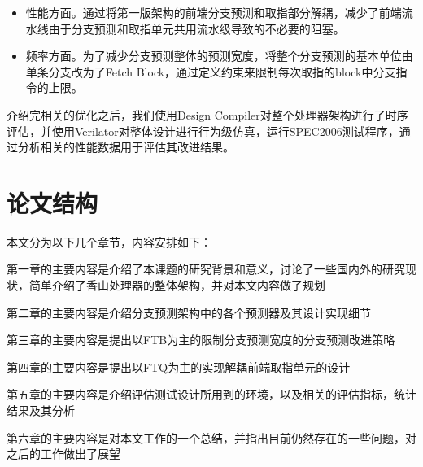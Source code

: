 \begin{itemize}
	\item 性能方面。通过将第一版架构的前端分支预测和取指部分解耦，减少了前端流水线由于分支预测和取指单元共用流水级导致的不必要的阻塞。
	\item 频率方面。为了减少分支预测整体的预测宽度，将整个分支预测的基本单位由单条分支改为了Fetch Block，通过定义约束来限制每次取指的block中分支指令的上限。
\end{itemize}

介绍完相关的优化之后，我们使用Design Compiler对整个处理器架构进行了时序评估，并使用Verilator对整体设计进行行为级仿真，运行SPEC2006测试程序，通过分析相关的性能数据用于评估其改进结果。

\section{论文结构}

本文分为以下几个章节，内容安排如下：

第一章的主要内容是介绍了本课题的研究背景和意义，讨论了一些国内外的研究现状，简单介绍了香山处理器的整体架构，并对本文内容做了规划

第二章的主要内容是介绍分支预测架构中的各个预测器及其设计实现细节

第三章的主要内容是提出以FTB为主的限制分支预测宽度的分支预测改进策略

第四章的主要内容是提出以FTQ为主的实现解耦前端取指单元的设计


第五章的主要内容是介绍评估测试设计所用到的环境，以及相关的评估指标，统计结果及其分析

第六章的主要内容是对本文工作的一个总结，并指出目前仍然存在的一些问题，对之后的工作做出了展望

